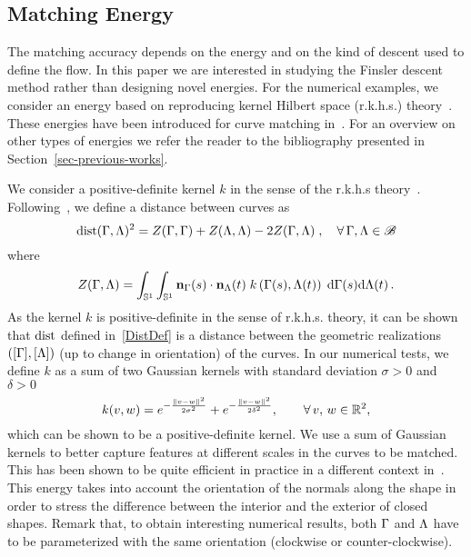 \subsection{Matching Energy}

The matching accuracy  depends on  the energy and on the kind of descent used to define the flow. 
In this paper we are interested in studying the Finsler descent method rather than designing novel energies. For the numerical examples, we consider an energy based on reproducing kernel Hilbert space (r.k.h.s.) theory~\cite{rkhs, rkhs2}.  These energies  have been introduced for curve matching in~\cite{currents-matching, Glaunes-matching}. For an overview on other types of energies we refer the reader to  the bibliography presented in Section~\ref{sec-previous-works}.

We consider a positive-definite kernel $k$ in the sense of the r.k.h.s theory~\cite{rkhs,rkhs2}. Following~\cite{currents-matching}, we  define a distance between curves as
\begin{equation}\label{DistDef}
	{\rm dist}(\Gamma,\Lambda)^2 = Z(\Gamma,\Gamma) + Z(\Lambda,\Lambda) - 2 Z(\Gamma,\Lambda)\;, \quad 
	\forall \, \Gamma, \Lambda \in \mathcal{B}
\end{equation}
where 
\begin{equation}\label{int-H}
  	Z(\Gamma,\Lambda) =  \int_{\mathbb{S}^1} \int_{\mathbb{S}^1} \mathbf{n}_{\Gamma}(s) \cdot \mathbf{n}_{\Lambda}(t) \; 
	k\left( \Gamma(s) , \Lambda(t) \right)\;\mathrm{d} \Gamma(s) \mathrm{d} \Lambda(t)\,.
\end{equation}
As the kernel $k$ is positive-definite in the sense of r.k.h.s. theory, it can be shown that $\rm{dist}$ defined in~\eqref{DistDef} is a distance between the geometric realizations $([\Gamma], [\Lambda])$ (up to change in orientation) of the curves. In our numerical tests, we define $k$ as a sum of two Gaussian kernels with standard deviation $\sigma>0$ and $\delta>0$
\begin{equation}\label{kernel}
	k(v, w) =  e^{-\frac{\| v-w \|^2}{2\sigma^2}} + e^{-\frac{\| v-w \|^2}{2\delta^2} }, 
	\quad \quad \forall \, v,\,w\in \mathbb{R}^2, 
\end{equation}
which can be shown to be a positive-definite kernel. We use a sum of Gaussian kernels to better capture features at different scales in the curves to be matched. This has been shown to be quite efficient in practice in a different context in~\cite{FX-ref}.  This energy takes into account the orientation of   the normals along the shape in order to stress the difference between the interior and the exterior of closed shapes. Remark that, to obtain interesting numerical results, both $\Gamma$ and $\Lambda$ have to be parameterized with the same orientation (clockwise or counter-clockwise). 

